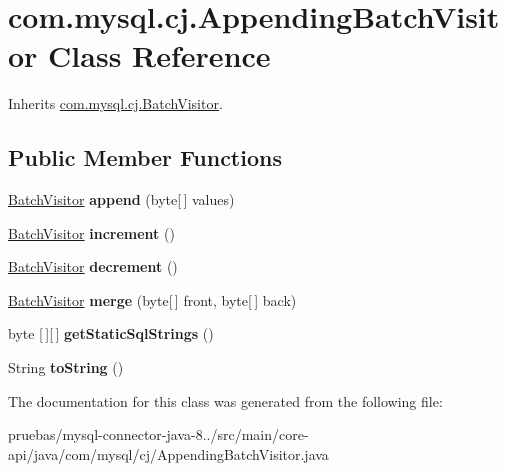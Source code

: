\hypertarget{classcom_1_1mysql_1_1cj_1_1_appending_batch_visitor}{}\section{com.\+mysql.\+cj.\+Appending\+Batch\+Visitor Class Reference}
\label{classcom_1_1mysql_1_1cj_1_1_appending_batch_visitor}


Inherits \mbox{\hyperlink{interfacecom_1_1mysql_1_1cj_1_1_batch_visitor}{com.\+mysql.\+cj.\+Batch\+Visitor}}.

\subsection*{Public Member Functions}
\begin{DoxyCompactItemize}
\item 
\mbox{\label{classcom_1_1mysql_1_1cj_1_1_appending_batch_visitor_ab8ff7b399d4a2f5c99b0a08afae95012}} 
\mbox{\hyperlink{interfacecom_1_1mysql_1_1cj_1_1_batch_visitor}{Batch\+Visitor}} {\bfseries append} (byte\mbox{[}$\,$\mbox{]} values)
\item 
\mbox{\label{classcom_1_1mysql_1_1cj_1_1_appending_batch_visitor_ad594c2e002438dcbc9079af8ee99c3c1}} 
\mbox{\hyperlink{interfacecom_1_1mysql_1_1cj_1_1_batch_visitor}{Batch\+Visitor}} {\bfseries increment} ()
\item 
\mbox{\label{classcom_1_1mysql_1_1cj_1_1_appending_batch_visitor_a1f3469887d7b40e881ceb47bb912ec07}} 
\mbox{\hyperlink{interfacecom_1_1mysql_1_1cj_1_1_batch_visitor}{Batch\+Visitor}} {\bfseries decrement} ()
\item 
\mbox{\label{classcom_1_1mysql_1_1cj_1_1_appending_batch_visitor_a75f638cd1726c922c747767d693c0288}} 
\mbox{\hyperlink{interfacecom_1_1mysql_1_1cj_1_1_batch_visitor}{Batch\+Visitor}} {\bfseries merge} (byte\mbox{[}$\,$\mbox{]} front, byte\mbox{[}$\,$\mbox{]} back)
\item 
\mbox{\label{classcom_1_1mysql_1_1cj_1_1_appending_batch_visitor_a3f735090eea41d6ecc28c9d0c24e170a}} 
byte \mbox{[}$\,$\mbox{]}\mbox{[}$\,$\mbox{]} {\bfseries get\+Static\+Sql\+Strings} ()
\item 
\mbox{\label{classcom_1_1mysql_1_1cj_1_1_appending_batch_visitor_a69995f09d9262780787f48744a145b21}} 
String {\bfseries to\+String} ()
\end{DoxyCompactItemize}


The documentation for this class was generated from the following file\+:\begin{DoxyCompactItemize}
\item 
pruebas/mysql-\/connector-\/java-\/8../src/main/core-\/api/java/com/mysql/cj/Appending\+Batch\+Visitor.\+java\end{DoxyCompactItemize}
